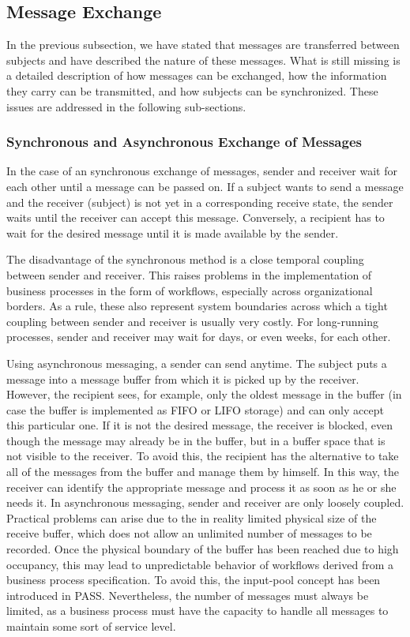 \subsection{Message Exchange}

In the previous subsection, we have stated that messages are transferred between subjects and have described the nature of these messages. What is still missing is a detailed description of how messages can be exchanged, how the information they carry can be transmitted, and how subjects can be synchronized. These issues are addressed in the following sub-sections.

\subsubsection{Synchronous and Asynchronous Exchange of Messages}

In the case of an synchronous exchange of messages, sender and receiver wait for each other until a message can be passed on. If a subject wants to send a message and the receiver (subject) is not yet in a corresponding receive state, the sender waits until the receiver can accept this message. Conversely, a recipient has to wait for the desired message until it is made available by the sender.

The disadvantage of the synchronous method is a close temporal coupling between sender and receiver. This raises problems in the implementation of business processes in the form of workflows, especially across organizational borders. As a rule, these also represent system boundaries across which a tight coupling between sender and receiver is usually very costly. For long-running processes, sender and receiver may wait for days, or even weeks, for each other.

Using asynchronous messaging, a sender can send anytime. The subject puts a message into a message buffer from which it is picked up by the receiver. However, the recipient sees, for example, only the oldest message in the buffer (in case the buffer is implemented as FIFO or LIFO storage) and can only accept this particular one. If it is not the desired message, the receiver is blocked, even though the message may already be in the buffer, but in a buffer space that is not visible to the receiver. To avoid this, the recipient has the alternative to take all of the messages from the buffer and manage them by himself. In this way, the receiver can identify the appropriate message and process it as soon as he or she needs it. In asynchronous messaging, sender and receiver are only loosely coupled. Practical problems can arise due to the in reality limited physical size of the receive buffer, which does not allow an unlimited number of messages to be recorded. Once the physical boundary of the buffer has been reached due to high occupancy, this may lead to unpredictable behavior of workflows derived from a business process specification. To avoid this, the input-pool concept has been introduced in PASS. Nevertheless, the number of messages must always be limited, as a business process must have the capacity to handle all messages to maintain some sort of service level.


